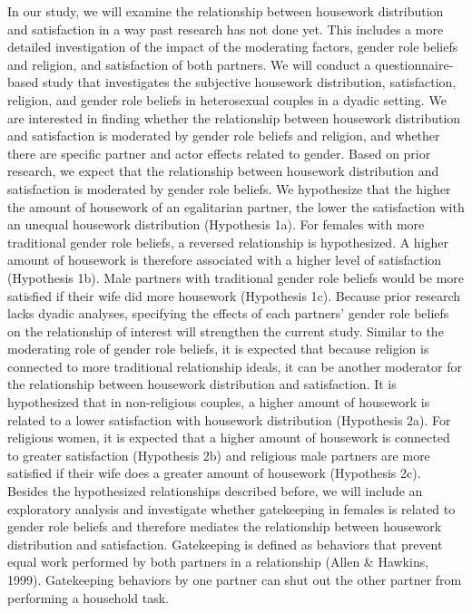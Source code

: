 \documentclass[
  english,
  man]{apa6}
\begin{document}
In our study, we will examine the relationship between housework distribution and satisfaction in a way past research has not done yet. This includes a more detailed investigation of the impact of the moderating factors, gender role beliefs and religion, and satisfaction of both partners. We will conduct a questionnaire-based study that investigates the subjective housework distribution, satisfaction, religion, and gender role beliefs in heterosexual couples in a dyadic setting. We are interested in finding whether the relationship between housework distribution and satisfaction is moderated by gender role beliefs and religion, and whether there are specific partner and actor effects related to gender.
Based on prior research, we expect that the relationship between housework distribution and satisfaction is moderated by gender role beliefs. We hypothesize that the higher the amount of housework of an egalitarian partner, the lower the satisfaction with an unequal housework distribution (Hypothesis 1a). For females with more traditional gender role beliefs, a reversed relationship is hypothesized. A higher amount of housework is therefore associated with a higher level of satisfaction (Hypothesis 1b). Male partners with traditional gender role beliefs would be more satisfied if their wife did more housework (Hypothesis 1c). Because prior research lacks dyadic analyses, specifying the effects of each partners' gender role beliefs on the relationship of interest will strengthen the current study.
Similar to the moderating role of gender role beliefs, it is expected that because religion is connected to more traditional relationship ideals, it can be another moderator for the relationship between housework distribution and satisfaction. It is hypothesized that in non-religious couples, a higher amount of housework is related to a lower satisfaction with housework distribution (Hypothesis 2a). For religious women, it is expected that a higher amount of housework is connected to greater satisfaction (Hypothesis 2b) and religious male partners are more satisfied if their wife does a greater amount of housework (Hypothesis 2c).
Besides the hypothesized relationships described before, we will include an exploratory analysis and investigate whether gatekeeping in females is related to gender role beliefs and therefore mediates the relationship between housework distribution and satisfaction. Gatekeeping is defined as behaviors that prevent equal work performed by both partners in a relationship (Allen \& Hawkins, 1999). Gatekeeping behaviors by one partner can shut out the other partner from performing a household task.
\end{document}
